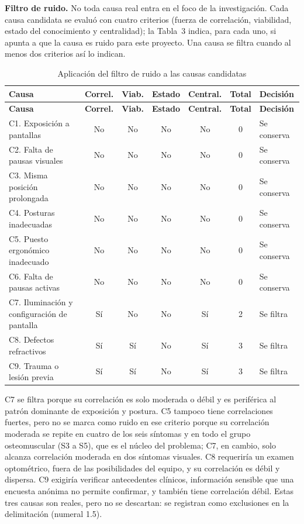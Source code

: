 \bigskip
\noindent\textbf{Filtro de ruido.} No toda causa real entra en el foco de la
investigación. Cada causa candidata se evaluó con cuatro criterios (fuerza de
correlación, viabilidad, estado del conocimiento y centralidad); la Tabla~3 indica, para
cada uno, si apunta a que la causa es ruido para este proyecto. Una causa se filtra
cuando al menos dos criterios así lo indican.

\bigskip
\begin{center}
\small
\setlength{\tabcolsep}{3pt}
\begin{longtable}{L{4.4cm} c c c c c L{2.5cm}}
\caption{Aplicación del filtro de ruido a las causas candidatas} \\
\toprule
\textbf{Causa} & \textbf{Correl.} & \textbf{Viab.} & \textbf{Estado} & \textbf{Central.} & \textbf{Total} & \textbf{Decisión} \\
\midrule
\endfirsthead
\toprule
\textbf{Causa} & \textbf{Correl.} & \textbf{Viab.} & \textbf{Estado} & \textbf{Central.} & \textbf{Total} & \textbf{Decisión} \\
\midrule
\endhead
C1. Exposición a pantallas & No & No & No & No & 0 & Se conserva \\
C2. Falta de pausas visuales & No & No & No & No & 0 & Se conserva \\
C3. Misma posición prolongada & No & No & No & No & 0 & Se conserva \\
C4. Posturas inadecuadas & No & No & No & No & 0 & Se conserva \\
C5. Puesto ergonómico inadecuado & No & No & No & No & 0 & Se conserva \\
C6. Falta de pausas activas & No & No & No & No & 0 & Se conserva \\
C7. Iluminación y configuración de pantalla & Sí & No & No & Sí & 2 & Se filtra \\
C8. Defectos refractivos & Sí & Sí & No & Sí & 3 & Se filtra \\
C9. Trauma o lesión previa & Sí & Sí & No & Sí & 3 & Se filtra \\
\bottomrule
\end{longtable}
\end{center}

\noindent C7 se filtra porque su correlación es solo moderada o débil y es periférica al
patrón dominante de exposición y postura. C5 tampoco tiene correlaciones fuertes, pero no
se marca como ruido en ese criterio porque su correlación moderada se repite en cuatro de
los seis síntomas y en todo el grupo osteomuscular (S3 a S5), que es el núcleo del
problema; C7, en cambio, solo alcanza correlación moderada en dos síntomas visuales. C8 requeriría un examen optométrico, fuera de
las posibilidades del equipo, y su correlación es débil y dispersa. C9 exigiría
verificar antecedentes clínicos, información sensible que una encuesta anónima no
permite confirmar, y también tiene correlación débil. Estas tres causas son reales, pero
no se descartan: se registran como exclusiones en la delimitación (numeral 1.5).

